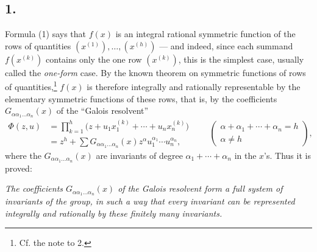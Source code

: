 \documentclass[11pt]{article}
\begin{document}
\subsection*{1.}
Formula (1) says that $f(x)$ is an integral rational symmetric function of the rows of quantities $(x^{(1)}),
\ldots,(x^{(h)})$ --- and indeed, since each summand $f(x^{(k)})$ contains only the one row $(x^{(k)})$, this is the simplest case, usually called the \emph{one-form} case. By the known theorem on symmetric functions of rows of quantities,\footnote{Cf. the note to 2.} $f(x)$ is therefore integrally and rationally representable by the elementary symmetric functions of these rows, that is, by the coefficients $G_{\alpha\alpha_1\ldots\alpha_n}(x)$ of the ``Galois resolvent''
\[
\begin{aligned}
  \Phi(z,u)
  &=\prod_{k=1}^{h}\bigl(z+u_1x_1^{(k)}+\cdots+u_nx_n^{(k)}\bigr) \\
  &=z^h+
    \sum G_{\alpha\alpha_1\ldots\alpha_n}(x)
    z^{\alpha}u_1^{\alpha_1}\cdots u_n^{\alpha_n},
\end{aligned}
\qquad
\left(\begin{array}{c}
\alpha+\alpha_1+
\cdots+
\alpha_n=h\\
\alpha\ne h
\end{array}\right),
\]
where the $G_{\alpha\alpha_1\ldots\alpha_n}(x)$ are invariants of degree $\alpha_1+\cdots+\alpha_n$ in the $x$'s. Thus it is proved:

\emph{The coefficients $G_{\alpha\alpha_1\ldots\alpha_n}(x)$ of the Galois resolvent form a full system of invariants of the group, in such a way that every invariant can be represented integrally and rationally by these finitely many invariants.}
\end{document}
